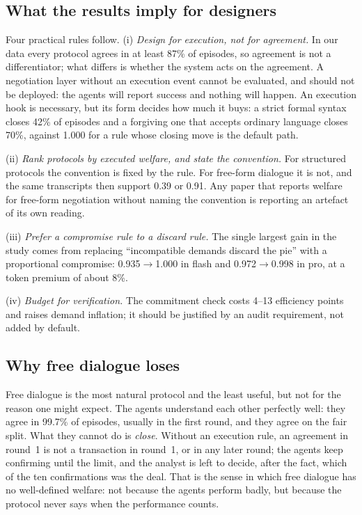 \documentclass[11pt]{article}
\begin{document}
\subsection{What the results imply for designers}

Four practical rules follow. (i) \emph{Design for execution, not for agreement.} In our data every protocol agrees in at least 87\% of episodes, so agreement is not a differentiator; what differs is whether the system acts on the agreement. A negotiation layer without an execution event cannot be evaluated, and should not be deployed: the agents will report success and nothing will happen. An execution hook is necessary, but its form decides how much it buys: a strict formal syntax closes 42\% of episodes and a forgiving one that accepts ordinary language closes 70\%, against 1.000 for a rule whose closing move is the default path.

(ii) \emph{Rank protocols by executed welfare, and state the convention.} For structured protocols the convention is fixed by the rule. For free-form dialogue it is not, and the same transcripts then support 0.39 or 0.91. Any paper that reports welfare for free-form negotiation without naming the convention is reporting an artefact of its own reading.

(iii) \emph{Prefer a compromise rule to a discard rule.} The single largest gain in the study comes from replacing ``incompatible demands discard the pie'' with a proportional compromise: 0.935$\to$1.000 in flash and 0.972$\to$0.998 in pro, at a token premium of about 8\%.

(iv) \emph{Budget for verification.} The commitment check costs 4--13 efficiency points and raises demand inflation; it should be justified by an audit requirement, not added by default.

\subsection{Why free dialogue loses}

Free dialogue is the most natural protocol and the least useful, but not for the reason one might expect. The agents understand each other perfectly well: they agree in 99.7\% of episodes, usually in the first round, and they agree on the fair split. What they cannot do is \emph{close}. Without an execution rule, an agreement in round~1 is not a transaction in round~1, or in any later round; the agents keep confirming until the limit, and the analyst is left to decide, after the fact, which of the ten confirmations was the deal. That is the sense in which free dialogue has no well-defined welfare: not because the agents perform badly, but because the protocol never says when the performance counts.
\end{document}
